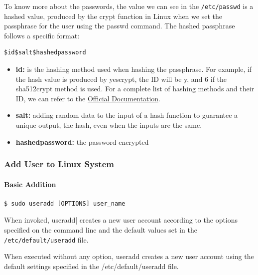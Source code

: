 \documentclass{article}
\newenvironment{blocktemplateI}[1]{%
    \tcolorbox[beamer,%
    noparskip,breakable,
    colframe=Violet,%
    colbacklower=Black,%
    title=#1]}%
    {\endtcolorbox}
\newenvironment{blocktemplateII}[1]{%
    \tcolorbox[beamer,%
    noparskip,breakable,
    colframe=Green,%
    colbacklower=LimeGreen!75!LightGreen,%
    title=#1]}%
    {\endtcolorbox}
\newenvironment{codetemplate}[1][]{%
  \mybasecolorbox[#1]
  \itshape
}{%
  \endmybasecolorbox
}
\begin{document}
\begin{blocktemplateI}{NOTE}
To know more about the passwords, the value we can see in the \verb|/etc/passwd| is a hashed value, produced by the crypt function in Linux when we set the passphrase for the user using the passwd command. The hashed passphrase follows a specific format:
\begin{codetemplate}{}
\begin{verbatim}
$id$salt$hashedpassword
\end{verbatim}
\end{codetemplate}
\begin{itemize}
    \item \textbf{id:} is the hashing method used when hashing the passphrase. For example, if the hash value is produced by yescrypt, the ID will be y, and 6 if the sha512crypt method is used. For a complete list of hashing methods and their ID, we can refer to the \href{https://manpages.debian.org/unstable/libcrypt-dev/crypt.5.en.html}{Official Documentation}.
    \item \textbf{salt:} adding random data to the input of a hash function to guarantee a unique output, the hash, even when the inputs are the same.
    \item \textbf{hashedpassword:} the password encrypted
\end{itemize}
\end{blocktemplateI}

\subsubsection{Add User to Linux System}
\paragraph{Basic Addition}
\begin{codetemplate}{}
\begin{verbatim}
$ sudo useradd [OPTIONS] user_name
\end{verbatim}
\end{codetemplate}
When invoked, \verb||useradd| creates a new user account according to the options specified on the command line and the default values set in the \verb|/etc/default/useradd| file.

\begin{blocktemplateII}{NOTE}
When executed without any option, useradd creates a new user account using the default settings specified in the /etc/default/useradd file.
\end{blocktemplateII}
\end{document}
